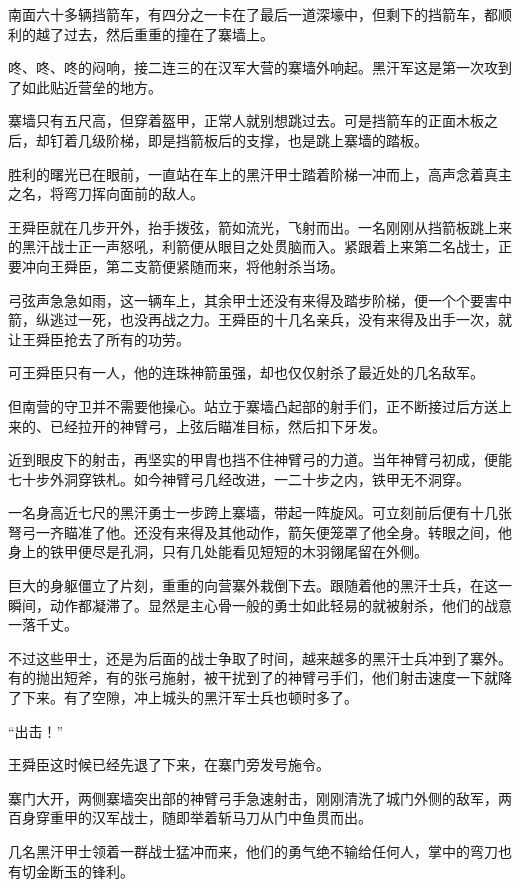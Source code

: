 南面六十多辆挡箭车，有四分之一卡在了最后一道深壕中，但剩下的挡箭车，都顺利的越了过去，然后重重的撞在了寨墙上。

咚、咚、咚的闷响，接二连三的在汉军大营的寨墙外响起。黑汗军这是第一次攻到了如此贴近营垒的地方。

寨墙只有五尺高，但穿着盔甲，正常人就别想跳过去。可是挡箭车的正面木板之后，却钉着几级阶梯，即是挡箭板后的支撑，也是跳上寨墙的踏板。

胜利的曙光已在眼前，一直站在车上的黑汗甲士踏着阶梯一冲而上，高声念着真主之名，将弯刀挥向面前的敌人。

王舜臣就在几步开外，抬手拨弦，箭如流光，飞射而出。一名刚刚从挡箭板跳上来的黑汗战士正一声怒吼，利箭便从眼目之处贯脑而入。紧跟着上来第二名战士，正要冲向王舜臣，第二支箭便紧随而来，将他射杀当场。

弓弦声急急如雨，这一辆车上，其余甲士还没有来得及踏步阶梯，便一个个要害中箭，纵逃过一死，也没再战之力。王舜臣的十几名亲兵，没有来得及出手一次，就让王舜臣抢去了所有的功劳。

可王舜臣只有一人，他的连珠神箭虽强，却也仅仅射杀了最近处的几名敌军。

但南营的守卫并不需要他操心。站立于寨墙凸起部的射手们，正不断接过后方送上来的、已经拉开的神臂弓，上弦后瞄准目标，然后扣下牙发。

近到眼皮下的射击，再坚实的甲胄也挡不住神臂弓的力道。当年神臂弓初成，便能七十步外洞穿铁札。如今神臂弓几经改进，一二十步之内，铁甲无不洞穿。

一名身高近七尺的黑汗勇士一步跨上寨墙，带起一阵旋风。可立刻前后便有十几张弩弓一齐瞄准了他。还没有来得及其他动作，箭矢便笼罩了他全身。转眼之间，他身上的铁甲便尽是孔洞，只有几处能看见短短的木羽翎尾留在外侧。

巨大的身躯僵立了片刻，重重的向营寨外栽倒下去。跟随着他的黑汗士兵，在这一瞬间，动作都凝滞了。显然是主心骨一般的勇士如此轻易的就被射杀，他们的战意一落千丈。

不过这些甲士，还是为后面的战士争取了时间，越来越多的黑汗士兵冲到了寨外。有的抛出短斧，有的张弓施射，被干扰到了的神臂弓手们，他们射击速度一下就降了下来。有了空隙，冲上城头的黑汗军士兵也顿时多了。

“出击！”

王舜臣这时候已经先退了下来，在寨门旁发号施令。

寨门大开，两侧寨墙突出部的神臂弓手急速射击，刚刚清洗了城门外侧的敌军，两百身穿重甲的汉军战士，随即举着斩马刀从门中鱼贯而出。

几名黑汗甲士领着一群战士猛冲而来，他们的勇气绝不输给任何人，掌中的弯刀也有切金断玉的锋利。

